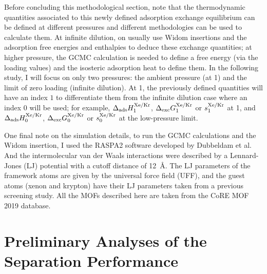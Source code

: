\documentclass[main.tex]{subfiles}
\begin{document}
Before concluding this methodological section, note that the thermodynamic quantities associated to this newly defined adsorption exchange equilibrium can be defined at different pressures and different methodologies can be used to calculate them. At infinite dilution, on usually use Widom insertions and the adsorption free energies and enthalpies to deduce these exchange quantities; at higher pressure, the GCMC calculation is needed to define a free energy (via the loading values) and the isosteric adsorption heat to define them. In the following study, I will focus on only two pressures: the ambient pressure (at \SI{1}{\atm}) and the limit of zero loading (infinite dilution). At \SI{1}{\atm}, the previously defined quantities will have an index $1$ to differentiate them from the infinite dilution case where an index $0$ will be used; for example, $\Delta_{\text{ads}}H_{\text{1}}^{\text{Xe/Kr}}$, $\Delta_{\text{exc}}G_{\text{1}}^{\text{Xe/Kr}}$ or $s_{\text{1}}^{\text{Xe/Kr}}$ at \SI{1}{\atm}, and $\Delta_{\text{ads}}H_{\text{0}}^{\text{Xe/Kr}}$, $\Delta_{\text{exc}}G_{\text{0}}^{\text{Xe/Kr}}$ or $s_{\text{0}}^{\text{Xe/Kr}}$ at the low-pressure limit. 

One final note on the simulation details, to run the GCMC calculations and the Widom insertion, I used the RASPA2 software developed by Dubbeldam et al.\autocite{dubbeldam2016} And the intermolecular van der Waals interactions were described by a Lennard-Jones (LJ) potential with a cutoff distance of \SI{12}{\angstrom}. The LJ parameters of the framework atoms are given by the universal force field (UFF),\autocite{rappe1992} and the guest atoms (xenon and krypton) have their LJ parameters taken from a previous screening study.\autocite{Ryan_2010} All the MOFs described here are taken from the CoRE MOF 2019 database.\autocite{Chung_2019}


\section{Preliminary Analyses of the Separation Performance}
\end{document}
